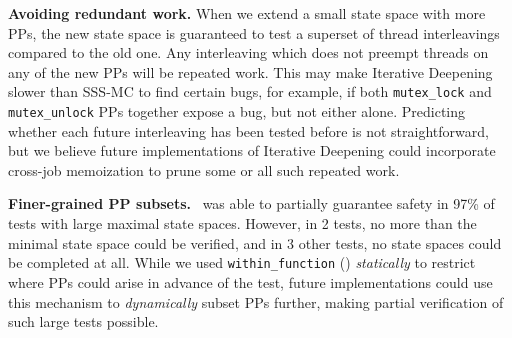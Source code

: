 {\bf Avoiding redundant work.}
When we extend a small state space with more PPs, the new state space is guaranteed to test a superset of thread interleavings compared to the old one.
Any interleaving which does not preempt threads on any of the new PPs will be repeated work.
%
This may make Iterative Deepening slower than SSS-MC to find certain bugs,
for example, if both {\tt mutex\_lock} and {\tt mutex\_unlock} PPs together expose a bug, but not either alone.
Predicting whether each future interleaving has been tested before is not straightforward,
but we believe future implementations of Iterative Deepening could incorporate cross-job memoization
to prune some or all such repeated work.

{\bf Finer-grained PP subsets.}
\quicksand~was able to partially guarantee safety in 97\% of tests with large maximal state spaces.
However, in 2 tests, no more than the minimal state space could be verified,
and in 3 other tests, no state spaces could be completed at all.
While we used {\tt within\_function} (\sect{\ref{sec:landslide}}) {\em statically} to restrict where PPs could arise in advance of the test,
future
implementations could use this mechanism to {\em dynamically} subset PPs further,
making partial verification of such large tests possible.

